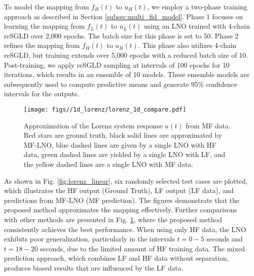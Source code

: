 To model the mapping from $f_H(t)$ to $u_H(t)$, we employ a two-phase training approach as described in Section \ref{subsec:multi_fid_model}. Phase 1 focuses on learning the mapping from $f_L(t)$ to $u_L(t)$ using an LNO trained with 4-chain reSGLD over 2,000 epochs. The batch size for this phase is set to 50. Phase 2 refines the mapping from $f_H(t)$ to $u_H(t)$. This phase also utilizes 4-chain reSGLD, but training extends over 5,000 epochs with a reduced batch size of 10. Post-training, we apply reSGLD sampling at intervals of 100 epochs for 10 iterations, which results in an ensemble of 10 models. These ensemble models are subsequently used to compute predictive means and generate 95\% confidence intervals for the outputs.  


\begin{figure}
    \centering
    \texttt{[image: figs//1d\_lorenz/lorenz\_1d\_compare.pdf]}
    \caption{Approximation of the Lorenz system response $u(t)$ from MF data. Red stars are ground truth, black solid lines are approximated by MF-LNO, blue dashed lines are given by a single LNO with HF data, green dashed lines are yielded by a single LNO with LF, and the yellow dashed lines are a single LNO with MF data.}
    \label{fig:lorenz_linear2}
\end{figure}
As shown in Fig. \ref{fig:lorenz_linear}, six randomly selected test cases are plotted, which illustrates the HF output (Ground Truth), LF output (LF data), and predictions from MF-LNO (MF prediction). The figures demonstrate that the proposed method approximates the mapping effectively. Further comparisons with other methods are presented in Fig. \ref{fig:lorenz_linear2}, where the proposed method consistently achieves the best performance. When using only HF data, the LNO exhibits poor generalization, particularly in the intervals $t = 0-5$ seconds and $t = 18-20$ seconds, due to the limited amount of HF training data. The mixed prediction approach, which combines LF and HF data without separation, produces biased results that are influenced by the LF data.

